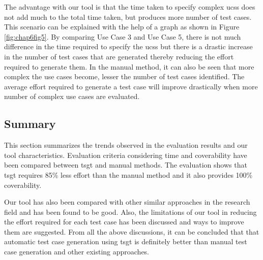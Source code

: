The advantage with our tool is that the time taken to specify complex \glspl{ucs} does not add much to the total time taken, but produces more number of test cases. This scenario can be explained with the help of a graph as shown in Figure \ref{fig:chap6fig5}. By comparing Use Case 3 and Use Case 5, there is not much difference in the time required to specify the \glspl{ucs} but there is a drastic increase in the number of test cases that are generated thereby reducing the effort required to generate them. In the manual method, it can also be seen that more complex the use cases become, lesser the number of test cases identified. The average effort required to generate a test case will improve drastically when more number of complex use cases are evaluated.

\subsection{Summary}
This section summarizes the trends observed in the evaluation results and our tool characteristics. Evaluation criteria considering time and coverability have been compared between \gls{tsgt} and manual methods. The evaluation shows that \gls{tsgt} requires 85\% less effort than the manual method and it also provides 100\% coverability. 

Our tool has also been compared with other similar approaches in the research field and has been found to be good. Also, the limitations of our tool in reducing the effort required for each test case has been discussed and ways to improve them are suggested. From all the above discussions, it can be concluded that that automatic test case generation using \gls{tsgt} is definitely better than manual test case generation and other existing approaches. 